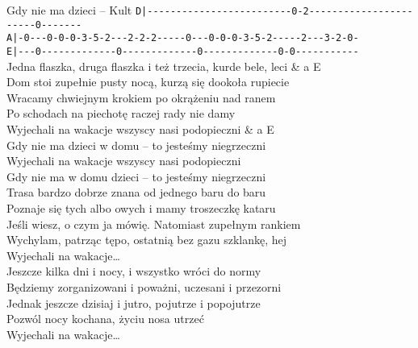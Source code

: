 \begin{piosenka}[-7mm]{Gdy nie ma dzieci -- Kult}
\small
\verb+D|-------------------------0-2-----------------------0-------+\\
\small
\verb+A|-0---0-0-0-3-5-2---2-2-2-----0---0-0-0-3-5-2-----2---3-2-0-+\\
\small
\verb+E|---0-------------0-------------0-------------0-0-----------+\\[5mm]

Jedna flaszka, druga flaszka i też trzecia, kurde bele, leci & a E \\
Dom stoi zupełnie pusty nocą, kurzą się dookoła rupiecie \\
Wracamy chwiejnym krokiem po okrążeniu nad ranem \\
Po schodach na piechotę raczej rady nie damy \\ [\zwrotkaspace]

 Wyjechali na wakacje wszyscy nasi podopieczni & a E \\ 
 Gdy nie ma dzieci w domu -- to jesteśmy niegrzeczni  \\
 Wyjechali na wakacje wszyscy nasi podopieczni \\
 Gdy nie ma w domu dzieci -- to jesteśmy niegrzeczni \\ [\zwrotkaspace] 

Trasa bardzo dobrze znana od jednego baru do baru \\
Poznaje się tych albo owych i mamy troszeczkę kataru \\
Jeśli wiesz, o czym ja mówię. Natomiast zupełnym rankiem \\ 
Wychylam, patrząc tępo, ostatnią bez gazu szklankę, hej \\[\zwrotkaspace]

 Wyjechali na wakacje\ldots \\ [\zwrotkaspace]

Jeszcze kilka dni i nocy, i wszystko wróci do normy \\ 
Będziemy zorganizowani i poważni, uczesani i przezorni \\ 
Jednak jeszcze dzisiaj i jutro, pojutrze i popojutrze \\
Pozwól nocy kochana, życiu nosa utrzeć \\[\zwrotkaspace]

 Wyjechali na wakacje\ldots \\ [\zwrotkaspace]

\end{piosenka}